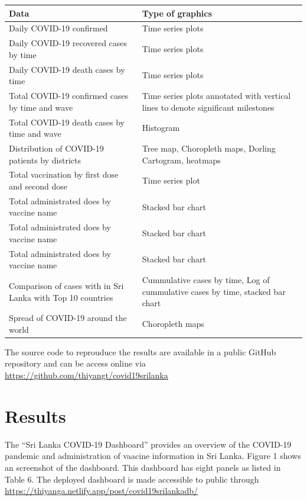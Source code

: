 \documentclass[
]{article}
\begin{document}
\begin{longtable}[]{@{}
  >{\raggedright\arraybackslash}p{}
  >{\raggedright\arraybackslash}p{}@{}}
\toprule
\textbf{Data} & \textbf{Type of graphics} \\
\midrule
\endhead
Daily COVID-19 confirmed & Time series plots \hfill\break \\
Daily COVID-19 recovered cases by time & Time series plots
\hfill\break \\
Daily COVID-19 death cases by time & Time series plots \hfill\break \\
Total COVID-19 confirmed cases by time and wave & Time series plots
annotated with vertical lines to denote significant milestones
\hfill\break \\
Total COVID-19 death cases by time and wave & Histogram \hfill\break \\
Distribution of COVID-19 patients by districts & Tree map, Choropleth
maps, Dorling Cartogram, heatmaps \hfill\break \\
Total vaccination by first dose and second dose & Time series plot
\hfill\break \\
Total administrated does by vaccine name & Stacked bar chart
\hfill\break \\
Total administrated does by vaccine name & Stacked bar chart
\hfill\break \\
Total administrated does by vaccine name & Stacked bar chart
\hfill\break \\
Comparison of cases with in Sri Lanka with Top 10 countries &
Cummulative cases by time, Log of cummulative cases by time, stacked bar
chart \hfill\break \\
Spread of COVID-19 around the world & Choropleth maps \hfill\break \\
\bottomrule
\end{longtable}

The source code to reprouduce the results are available in a public
GitHub repository and can be access online via
\url{https://github.com/thiyangt/covid19srilanka}

\hypertarget{results}{%
\section{Results}\label{results}}

The ``Sri Lanka COVID-19 Dashboard'' provides an overview of the
COVID-19 pandemic and administration of vaacine information in Sri
Lanka. Figure 1 shows an screenshot of the dashboard. This dashboard has
eight panels as listed in Table 6. The deployed dashboard is made
accessible to public through
\url{https://thiyanga.netlify.app/post/covid19srilankadb/}
\end{document}
